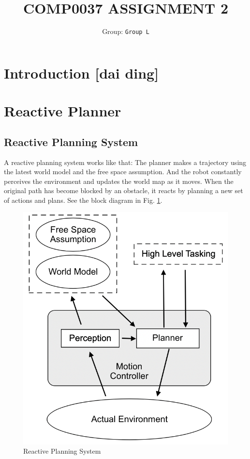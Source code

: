 \documentclass{article}
\title{COMP0037 ASSIGNMENT 2}
\author{
 Group: \texttt{Group L}\\
}
\date{}
\begin{document}
\maketitle



\section{Introduction [dai ding]} 

\section{Reactive Planner}
\subsection {Reactive Planning System}

A reactive planning system works like that: The planner makes a trajectory using the latest world model and the free space assumption. And the robot constantly perceives the environment and updates the world map as it moves. When the original path has become blocked by an obstacle, it reacts by planning a new set of actions and plans. See the block diagram in Fig. \ref {fig:reactivePlanningSystem}.

\begin{figure}[ht]
\centering
\includegraphics[scale=0.5]{graphs/part1/reactivePlanningSystem.PNG}
\caption{Reactive Planning System}
\label{fig:reactivePlanningSystem}
\end{figure}
\end{document}
